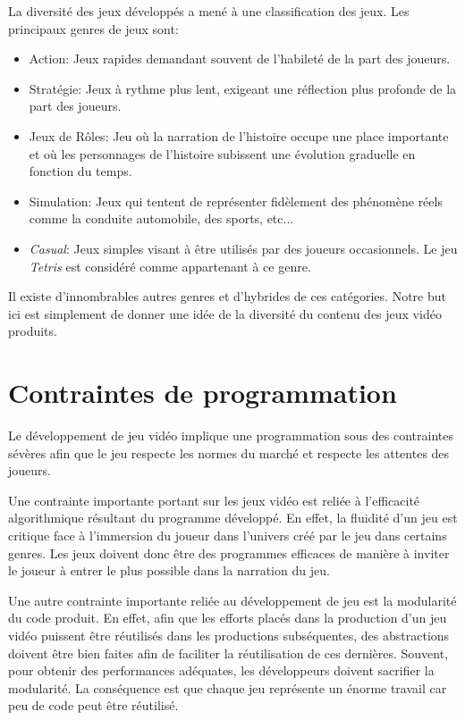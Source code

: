 \documentclass[12pt,oneside,letterpaper,francais]{book}
\begin{document}
La diversité des jeux développés a mené à une classification des
jeux. Les principaux genres de jeux sont:

\begin{itemize}
\item Action: Jeux rapides demandant souvent de l'habileté de la part
  des joueurs.
\item Stratégie: Jeux à rythme plus lent, exigeant une réflection plus
  profonde de la part des joueurs.
\item Jeux de Rôles: Jeu où la narration de l'histoire occupe une
  place importante et où les personnages de l'histoire subissent une
  évolution graduelle en fonction du temps.
\item Simulation: Jeux qui tentent de représenter fidèlement des
  phénomène réels comme la conduite automobile, des sports, etc...
\item \textit{Casual}: Jeux simples visant à être utilisés par des
  joueurs occasionnels. Le jeu \textit{Tetris} est considéré comme
  appartenant à ce genre.
\end{itemize}

Il existe d'innombrables autres genres et d'hybrides de ces
catégories. Notre but ici est simplement de donner une idée de la
diversité du contenu des jeux vidéo produits.



\section{Contraintes de programmation}

Le développement de jeu vidéo implique une programmation sous des
contraintes sévères afin que le jeu respecte les normes du marché
et respecte les attentes des joueurs.

Une contrainte importante portant sur les jeux vidéo est reliée à
l'efficacité algorithmique résultant du programme développé. En effet,
la fluidité d'un jeu est critique face à l'immersion du joueur dans
l'univers créé par le jeu dans certains genres. Les jeux doivent donc
être des programmes efficaces de manière à inviter le joueur à entrer
le plus possible dans la narration du jeu.

Une autre contrainte importante reliée au développement de jeu est la
modularité du code produit. En effet, afin que les efforts placés dans
la production d'un jeu vidéo puissent être réutilisés dans les
productions subséquentes, des abstractions doivent être bien faites
afin de faciliter la réutilisation de ces dernières. Souvent, pour
obtenir des performances adéquates, les développeurs doivent sacrifier
la modularité. La conséquence est que chaque jeu représente un énorme
travail car peu de code peut être réutilisé.
\end{document}
